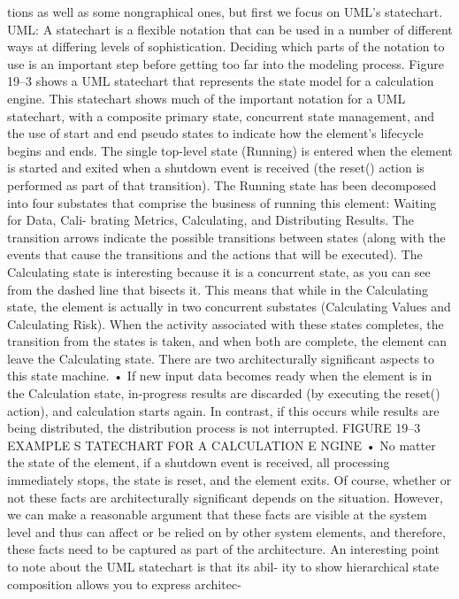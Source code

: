 tions as well as some nongraphical ones, but first we focus on UML’s statechart.
 UML: A statechart is a flexible notation that can be used in a number of
different ways at differing levels of sophistication. Deciding which parts
of the notation to use is an important step before getting too far into the
modeling process. Figure 19–3 shows a UML statechart that represents
the state model for a calculation engine.
This statechart shows much of the important notation for a UML
statechart, with a composite primary state, concurrent state management,
and the use of start and end pseudo states to indicate how the element’s
lifecycle begins and ends. The single top-level state (Running) is entered
when the element is started and exited when a shutdown event is
received (the reset() action is performed as part of that transition).
The Running state has been decomposed into four substates that
comprise the business of running this element: Waiting for Data, Cali-
brating Metrics, Calculating, and Distributing Results. The transition
arrows indicate the possible transitions between states (along with the
events that cause the transitions and the actions that will be executed).
The Calculating state is interesting because it is a concurrent state, as
you can see from the dashed line that bisects it. This means that while in
the Calculating state, the element is actually in two concurrent substates
(Calculating Values and Calculating Risk). When the activity associated
with these states completes, the transition from the states is taken, and
when both are complete, the element can leave the Calculating state.
There are two architecturally significant aspects to this state machine.
• If new input data becomes ready when the element is in the
Calculation state, in-progress results are discarded (by executing the
reset() action), and calculation starts again. In contrast, if this
occurs while results are being distributed, the distribution process is
not interrupted.
FIGURE 19–3 EXAMPLE S TATECHART FOR A CALCULATION E NGINE
• No matter the state of the element, if a shutdown event is received, all
processing immediately stops, the state is reset, and the element exits.
Of course, whether or not these facts are architecturally significant
depends on the situation. However, we can make a reasonable argument
that these facts are visible at the system level and thus can affect or be
relied on by other system elements, and therefore, these facts need to be
captured as part of the architecture.
An interesting point to note about the UML statechart is that its abil-
ity to show hierarchical state composition allows you to express architec-
